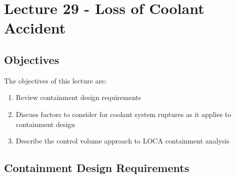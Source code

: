 \chapter{Lecture 29 - Loss of Coolant Accident}
\label{ch:ch29}
\section{Objectives}
The objectives of this lecture are:
\begin{enumerate}
\item Review containment design requirements
\item Discuss factors to consider for coolant system ruptures as it applies to containment design
\item Describe the control volume approach to LOCA containment analysis
\end{enumerate}

\section{Containment Design Requirements}


